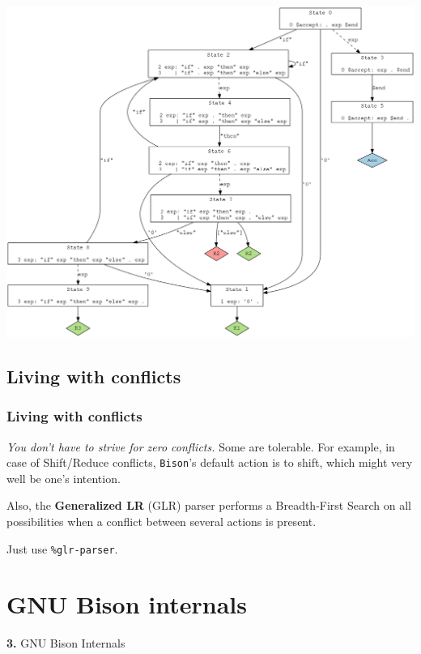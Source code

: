 \documentclass{beamer}
\begin{document}
\begin{frame}
  \begin{center}
    \includegraphics[scale=0.22]{else}
  \end{center}
\end{frame}

\subsection{Living with conflicts}

\begin{frame}
  \frametitle{Living with conflicts}

  \textit{You don't have to strive for zero conflicts.} Some are tolerable. For
  example, in case of Shift/Reduce conflicts, \texttt{Bison}'s default action is
  to shift, which might very well be one's intention.

  \vfill

  Also, the \textbf{Generalized LR} (GLR) parser performs a Breadth-First Search on all
  possibilities when a conflict between several actions is present.

  \vfill

  Just use \texttt{\%glr-parser}.
\end{frame}

\section{GNU Bison internals}

\begingroup
{}
\begin{frame}
    \begin{center}
        \vspace{1cm}
        {\Huge\color{black} \textbf{3.} { GNU Bison Internals}}
    \end{center}
\end{frame}
\endgroup
\end{document}
